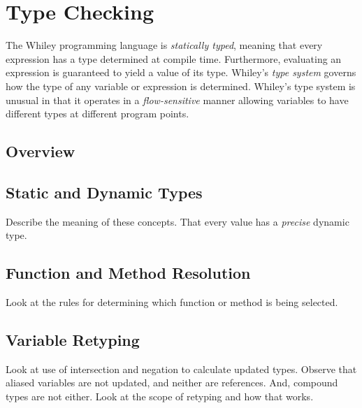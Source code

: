 \chapter{Type Checking}
The Whiley programming language is {\em statically typed}, meaning that every expression has a type determined at compile time.  Furthermore, evaluating an expression is guaranteed to yield a value of its type.  Whiley's {\em type system} governs how the type of any variable or expression is determined.  Whiley's type system is unusual in that it operates in a {\em flow-sensitive} manner allowing variables to have different types at different program points.


\section{Overview}


\section{Static and Dynamic Types}

Describe the meaning of these concepts.  That every value has a {\em precise} dynamic type.  

\section{Function and Method Resolution}
Look at the rules for determining which function or method is being selected.

\section{Variable Retyping}

Look at use of intersection and negation to calculate updated types.  Observe that aliased variables are not updated, and neither are references.  And, compound types are not either.  Look at the scope of retyping and how that works.

